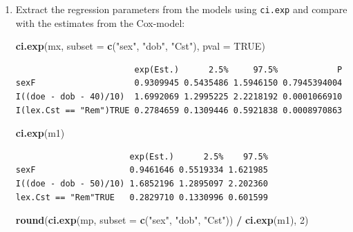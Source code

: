 \documentclass[
]{book}
\newenvironment{Shaded}{\begin{snugshade}}{\end{snugshade}}
\newcommand{\AttributeTok}[1]{\textcolor[rgb]{0.13,0.29,0.53}{#1}}
\newcommand{\ConstantTok}[1]{\textcolor[rgb]{0.56,0.35,0.01}{#1}}
\newcommand{\DecValTok}[1]{\textcolor[rgb]{0.00,0.00,0.81}{#1}}
\newcommand{\FunctionTok}[1]{\textcolor[rgb]{0.13,0.29,0.53}{\textbf{#1}}}
\newcommand{\NormalTok}[1]{#1}
\newcommand{\SpecialCharTok}[1]{\textcolor[rgb]{0.81,0.36,0.00}{\textbf{#1}}}
\newcommand{\StringTok}[1]{\textcolor[rgb]{0.31,0.60,0.02}{#1}}
\theoremstyle{definition}
\theoremstyle{definition}
\theoremstyle{definition}
\theoremstyle{definition}
\theoremstyle{remark}
\begin{document}
\begin{enumerate}
\begin{verbatim}
                        exp(Est.)      2.5%     97.5%
I(lex.Cst == "Rem")TRUE 0.2784659 0.1309446 0.5921838
I((doe - dob - 40)/10)  1.6992069 1.2995225 2.2218192
sexF                    0.9309945 0.5435486 1.5946150
\end{verbatim}

  We see that there is virtually no difference between the two
  approaches in terms of the regression parameters.
\item
  Extract the regression parameters from the models using
  \texttt{ci.exp} and compare with the estimates from the Cox-model:

\begin{Shaded}
\begin{Highlighting}[]
\FunctionTok{ci.exp}\NormalTok{(mx, }\AttributeTok{subset =} \FunctionTok{c}\NormalTok{(}\StringTok{"sex"}\NormalTok{, }\StringTok{"dob"}\NormalTok{, }\StringTok{"Cst"}\NormalTok{), }\AttributeTok{pval =} \ConstantTok{TRUE}\NormalTok{)}
\end{Highlighting}
\end{Shaded}

\begin{verbatim}
                        exp(Est.)      2.5%     97.5%            P
sexF                    0.9309945 0.5435486 1.5946150 0.7945394004
I((doe - dob - 40)/10)  1.6992069 1.2995225 2.2218192 0.0001066910
I(lex.Cst == "Rem")TRUE 0.2784659 0.1309446 0.5921838 0.0008970863
\end{verbatim}

\begin{Shaded}
\begin{Highlighting}[]
\FunctionTok{ci.exp}\NormalTok{(m1)}
\end{Highlighting}
\end{Shaded}

\begin{verbatim}
                       exp(Est.)      2.5%    97.5%
sexF                   0.9461646 0.5519334 1.621985
I((doe - dob - 50)/10) 1.6852196 1.2895097 2.202360
lex.Cst == "Rem"TRUE   0.2829710 0.1330996 0.601599
\end{verbatim}

\begin{Shaded}
\begin{Highlighting}[]
\FunctionTok{round}\NormalTok{(}\FunctionTok{ci.exp}\NormalTok{(mp, }\AttributeTok{subset =} \FunctionTok{c}\NormalTok{(}\StringTok{"sex"}\NormalTok{, }\StringTok{"dob"}\NormalTok{, }\StringTok{"Cst"}\NormalTok{)) }\SpecialCharTok{/} \FunctionTok{ci.exp}\NormalTok{(m1), }\DecValTok{2}\NormalTok{)}
\end{Highlighting}
\end{Shaded}


\end{enumerate}
\end{document}
